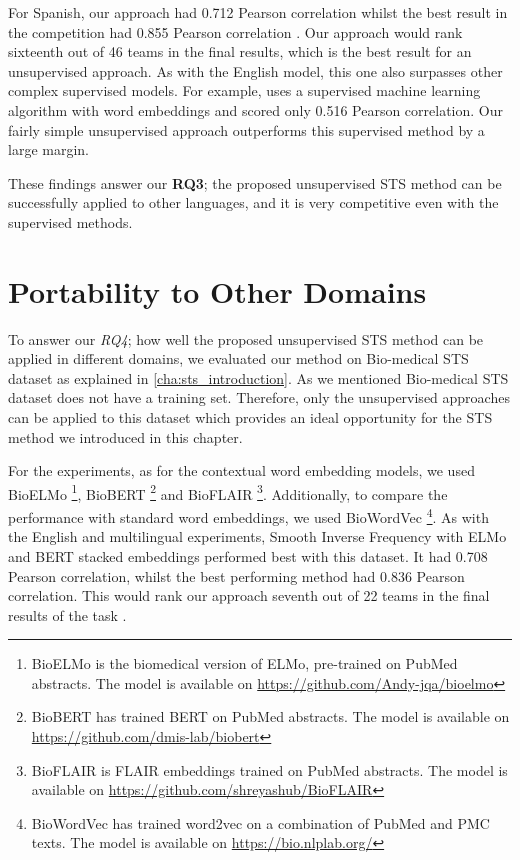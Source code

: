 For Spanish, our approach had 0.712 Pearson correlation whilst the best result \autocite{tian-etal-2017-ecnu} in the competition had 0.855 Pearson correlation \cite{cer-etal-2017-semeval}. Our approach would rank sixteenth out of 46 teams in the final results, which is the best result for an unsupervised approach. As with the English model, this one also surpasses other complex supervised models. For example, \cite{barrow-peskov-2017-umdeep} uses a supervised machine learning algorithm with word embeddings and scored only 0.516 Pearson correlation. Our fairly simple unsupervised approach outperforms this supervised method by a large margin. 

These findings answer our \textbf{RQ3}; the proposed unsupervised STS method can be successfully applied to other languages, and it is very competitive even with the supervised methods. 


\section{Portability to Other Domains}
\label{sec:state_domains}
To answer our \textit{RQ4}; how well the proposed unsupervised STS method can be applied in different domains, we evaluated our method on Bio-medical STS dataset as explained in \ref{cha:sts_introduction}. As we mentioned Bio-medical STS dataset does not have a training set. Therefore, only the unsupervised approaches can be applied to this dataset which provides an ideal opportunity for the STS method we introduced in this chapter. 

For the experiments, as for the contextual word embedding models, we used BioELMo \autocite{jin2019probing}\footnote{BioELMo is the biomedical version of ELMo, pre-trained on PubMed abstracts. The model is available on \url{https://github.com/Andy-jqa/bioelmo}}, BioBERT \autocite{10.1093/bioinformatics/btz682}\footnote{BioBERT has trained BERT on PubMed abstracts. The model is available on \url{https://github.com/dmis-lab/biobert}} and BioFLAIR \autocite{sharma2019bioflair}\footnote{BioFLAIR is FLAIR embeddings trained on PubMed abstracts. The model is available on \url{https://github.com/shreyashub/BioFLAIR}}. Additionally, to compare the performance with standard word embeddings, we used BioWordVec \autocite{Zhang2019}\footnote{BioWordVec has trained word2vec on a combination of PubMed and PMC texts. The model is available on \url{https://bio.nlplab.org/}}. As with the English and multilingual experiments, Smooth Inverse Frequency with ELMo and BERT stacked embeddings performed best with this dataset. It had 0.708 Pearson correlation, whilst the best performing method had 0.836 Pearson correlation. This would rank our approach seventh out of 22 teams in the final results of the task \autocite{10.1093/bioinformatics/btx238}.

